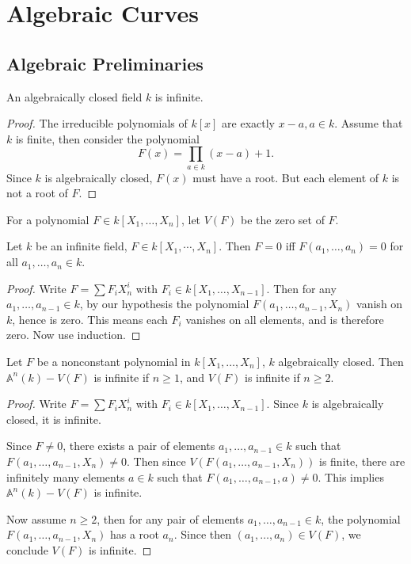 \chapter{Algebraic Curves}
\section{Algebraic Preliminaries}
\begin{proposition}
An algebraically closed field $k$ is infinite.
\end{proposition}
\begin{proof}
The irreducible polynomials of $k[x]$ are exactly $x-a,a\in k$. Assume that $k$ is finite, then consider the polynomial
\[F(x)=\prod_{a\in k}(x-a)+1.\]
Since $k$ is algebraically closed, $F(x)$ must have a root. But each element of $k$ is not a root of $F$.
\end{proof}
For a polynomial $F\in k[X_1,\dots,X_n]$, let $V(F)$ be the zero set of $F$.
\begin{proposition}
Let $k$ be an infinite field, $F\in k[X_1,\cdots,X_n]$. Then $F=0$ iff $F(a_1,\dots,a_n)=0$ for all $a_1,\dots,a_n\in k$.
\end{proposition}
\begin{proof}
Write $F=\sum F_iX_n^i$ with $F_i\in k[X_1,\dots,X_{n-1}]$. Then for any $a_1,\dots,a_{n-1}\in k$, by our hypothesis the polynomial $F(a_1,\dots,a_{n-1},X_n)$ vanish on $k$, hence is zero. This means each $F_i$ vanishes on all elements, and is therefore zero. Now use induction.
\end{proof}
\begin{proposition}\label{infinity V(F)}
Let $F$ be a nonconstant polynomial in $k[X_1,\dots,X_n]$, $k$ algebraically closed. Then $\mathbb{A}^n(k)-V(F)$ is infinite if $n\geq1$, and $V(F)$ is infinite if $n\geq2$.
\end{proposition}
\begin{proof}
Write $F=\sum F_iX_n^i$ with $F_i\in k[X_1,\dots,X_{n-1}]$. Since $k$ is algebraically closed, it is infinite.\par
Since $F\neq 0$, there exists a pair of elements $a_1,\dots,a_{n-1}\in k$ such that $F(a_1,\dots,a_{n-1},X_n)\neq 0$. Then since $V(F(a_1,\dots,a_{n-1},X_n))$ is finite, there are infinitely many elements $a\in k$ such that $F(a_1,\dots,a_{n-1},a)\neq 0$. This implies $\mathbb{A}^n(k)-V(F)$ is infinite.\par
Now assume $n\geq 2$, then for any pair of elements $a_1,\dots,a_{n-1}\in k$, the polynomial $F(a_1,\dots,a_{n-1},X_n)$ has a root $a_n$. Since then $(a_1,\dots,a_n)\in V(F)$, we conclude $V(F)$ is infinite. 
\end{proof}
